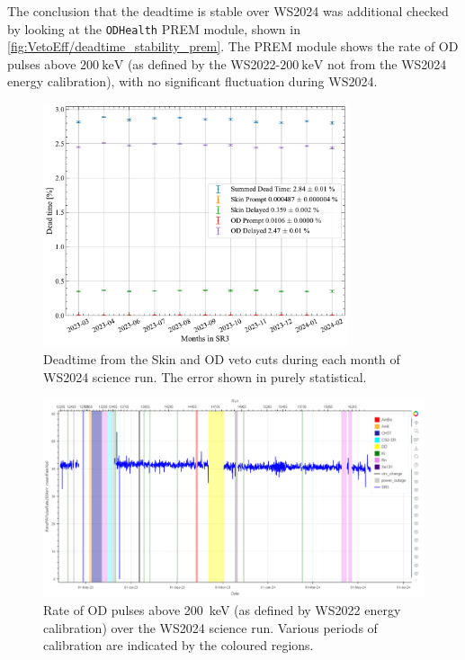 The conclusion that the deadtime is stable over WS2024 was additional checked by looking at the \lstinline{ODHealth} PREM module, shown in \autoref{fig:VetoEff/deadtime_stability_prem}.
The PREM module shows the rate of OD pulses above $200~\text{keV}$ (as defined by the WS2022-$200~\text{keV}$ not from the WS2024 energy calibration), with no significant fluctuation during WS2024.
\begin{figure}[!ht]
	\centering
	\includegraphics[width=0.8\textwidth]{figures/VetoEfficiency/SR3DeadTimeAll_expoFunc.pdf}
	\caption{Deadtime from the Skin and OD veto cuts during each month of WS2024 science run. The error shown in purely statistical.}
	\label{fig:VetoEff/deadtime_stability}
\end{figure}
\begin{figure}[!ht]
	\centering
	\includegraphics[width=\textwidth]{figures/VetoEfficiency/prem_od_stability.png}
	\caption{Rate of OD pulses above 200~keV (as defined by WS2022 energy calibration) over the WS2024 science run. Various periods of calibration are indicated by the coloured regions.}
	\label{fig:VetoEff/deadtime_stability_prem}
\end{figure}

